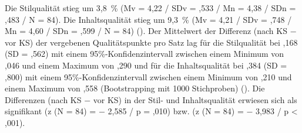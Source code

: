 Die Stilqualität stieg um 3,8~\% (Mv = 4,22 / SDv = ,533 / Mn = 4,38 / SDn = ,483 / N = 84). Die Inhaltsqualität stieg um 9,3~\% (Mv = 4,21 / SDv = ,748 / Mn = 4,60 / SDn = ,599 / N = 84) (). Der Mittelwert der Differenz (nach KS $-$ vor KS) der vergebenen Qualitätspunkte pro Satz lag für die Stilqualität bei ,168 (SD = ,562) mit einem 95\%\nobreakdash-Konfidenzintervall zwischen einem Minimum von ,046 und einem Maximum von ,290 und für die Inhaltsqualität bei ,384 (SD = ,800) mit einem 95\%\nobreakdash-Konfidenzintervall zwischen einem Minimum von ,210 und einem Maximum von ,558 (Bootstrapping mit 1000 Stichproben) (). Die Differenzen (nach KS $-$ vor KS) in der Stil- und Inhaltsqualität erwiesen sich als signifikant (z (N = 84) = $-$ 2,585 / p = ,010) bzw. (z (N = 84) = $-$ 3,983 / p < ,001).


\begin{figure}





















\captionsetup{width=.45\textwidth}
\begin{floatrow}
\end{floatrow}

\end{figure}


